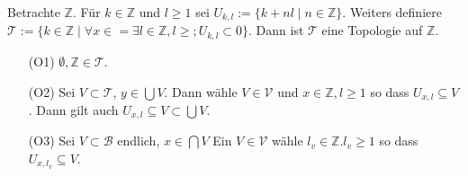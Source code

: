 {
Betrachte $\mathbb{Z}$. Für $k \in \mathbb{Z}$ und $l \ge 1$ sei $U_{k,l} := \{k+nl \mid n \in \mathbb{Z}\}$. 
Weiters definiere $\mathcal{T} := \{ k \in \mathbb{Z} \mid \forall x \in = \exists l \in \mathbb{Z}, l \ge ; U_{k,l} \subset 0\}$.
Dann ist $\mathcal{T}$ eine Topologie auf $\mathbb{Z}$.
\begin{itemize}
    \item[(O1)] $\emptyset, \mathbb{Z} \in \mathcal{T}$.
    \item[(O2)] Sei $V \subset \mathcal{T}$, $y\in \bigcup V$. 
    Dann wähle $V \in \mathcal{V}$ und $x \in \mathbb{Z}, l \ge 1$ so dass $U_{x,l} \subseteq V$.
    Dann gilt auch $U_{x,l} \subseteq V \subset \bigcup V$.
    \item[(O3)] Sei $V \subset\mathcal{B}$ endlich, $x \in \bigcap V$ Ein $V \in \mathcal{V}$ 
    wähle $l_v \in \mathbb{Z}. l_v \ge 1$ so dass $U_{x,l_v} \subseteq V$.
\end{itemize}
}
